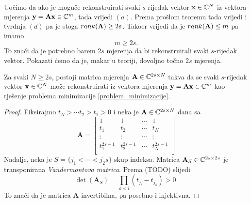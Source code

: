 \documentclass[a4paper,twoside,12pt]{memoir} %
\newcommand{\vect}[1]{\mathbf{#1}}
\newcommand{\rank}{\text\normalfont{rank}}
\begin{document}
Uo\v{c}imo da ako je mogu\v{c}e rekonstruirati svaki $s$-rijedak vektor $\vect x \in \C^N$ iz vektora mjerenja $\vect y = \vect{Ax} \in \C^m$, tada vrijedi $(a)$. Prema pro\v{s}lom teoremu tada vrijedi i tvrdnja $(d)$ pa je stoga $\rank(\vect A) \geq 2s$. Tako\dj er vrijedi da je $\rank(\vect A) \leq m$ pa imamo 
\begin{equation*}
    m \geq 2s.    
\end{equation*}
To zna\v{c}i da je potrebno barem $2s$ mjerenja da bi rekonstruirali svaki $s$-rijedak vektor. Pokazati \'cemo da je, makar u teoriji, dovoljno to\v{c}no $2s$ mjerenja.

\begin{thm}
    Za svaki $N \geq 2s$, postoji matrica mjerenja $\vect A \in \C^{2s \times N}$ takva da se svaki $s$-rijedak vektor $\vect x \in \C^N$ mo\v{z}e rekonstruirati iz vektora mjerenja $\vect y = \vect{Ax} \in \C^m$ kao rje\v{s}enje problema minimizacije \eqref{problem_minimizacije}.
\end{thm}
\begin{proof}
    Fiksirajmo $t_N>\cdots t_2 > t_1 > 0$ i neka je $\vect A \in \C^{2s \times N}$ dana sa
    \begin{equation}
        \vect A = 
        \begin{bmatrix}
            1 & 1 & \cdots & 1 \\ 
            t_1 & t_2 & \cdots & t_N \\
            \vdots & \vdots & \cdots & \vdots \\
            t_1^{2s-1} & t_2^{2s-1} & \cdots & t_N^{2s-1} \\
        \end{bmatrix}
    \end{equation}
    Nadalje, neka je $S=\{j_1 < \cdots < j_2s\}$ skup indeksa. Matrica $\vect A_S \in \C^{2s \times 2s}$ je transponirana \textit{Vandermontova matrica}. Prema (TODO) slijedi
    \begin{equation*}
        \det(\vect{A}_S) = \prod_{k < l} (t_{j_l} - t_{j_k})>0.
    \end{equation*}
    To zna\v{c}i da je matrica $\vect A$ invertibilna, pa posebno i injektivna.
\end{proof}





\nocite{*}
\end{document}
